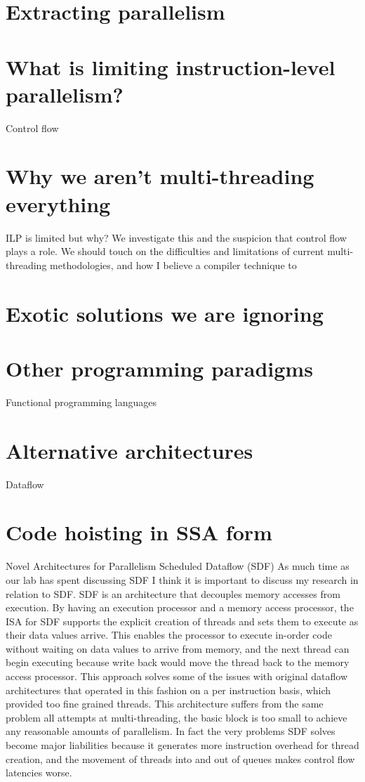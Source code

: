 \documentclass[12pt,twoside,letterpaper]{article}
\begin{document}
\section*{Extracting parallelism}
\section*{What is limiting instruction-level parallelism?}
Control flow
\section*{Why we aren't multi-threading everything}

ILP is limited but why? We investigate this and the suspicion that control flow plays a role. We should touch on the difficulties and limitations of current multi-threading methodologies, and how I believe a compiler technique to 


\section*{Exotic solutions we are ignoring}
\section*{Other programming paradigms}
Functional programming languages
\section*{Alternative architectures}
Dataflow

\section*{Code hoisting in SSA form}

Novel Architectures for Parallelism
Scheduled Dataflow (SDF)
As much time as our lab has spent discussing SDF I think it is important to discuss my research in relation to SDF. SDF is an architecture that decouples memory accesses from execution. By having an execution processor and a memory access processor, the ISA for SDF supports the explicit creation of threads and sets them to execute as their data values arrive. This enables the processor to execute in-order code without waiting on data values to arrive from memory, and the next thread can begin executing because write back would move the thread back to the memory access processor. This approach solves some of the issues with original dataflow architectures that operated in this fashion on a per instruction basis, which provided too fine grained threads. This architecture suffers from the same problem all attempts at multi-threading, the basic block is too small to achieve any reasonable amounts of parallelism. In fact the very problems SDF solves become major liabilities because it generates more instruction overhead for thread creation, and the movement of threads into and out of queues makes control flow latencies worse.
\end{document}
